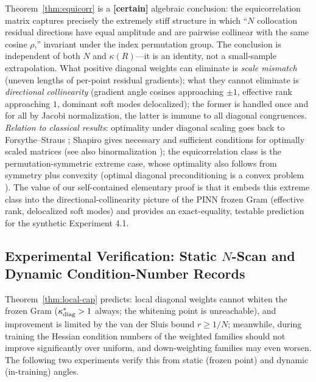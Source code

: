 \documentclass[11pt]{article}
\numberwithin{equation}{section}
\begin{document}
\noindent Theorem~\ref{thm:equicorr} is a \textbf{[certain]} algebraic conclusion: the equicorrelation matrix captures precisely the extremely stiff structure in which ``$N$ collocation residual directions have equal amplitude and are pairwise collinear with the same cosine $\rho$,'' invariant under the index permutation group. The conclusion is independent of both $N$ and $\kappa(R)$---it is an identity, not a small-sample extrapolation. What positive diagonal weights can eliminate is \emph{scale mismatch} (uneven lengths of per-point residual gradients); what they cannot eliminate is \emph{directional collinearity} (gradient angle cosines approaching $\pm1$, effective rank approaching $1$, dominant soft modes delocalized); the former is handled once and for all by Jacobi normalization, the latter is immune to all diagonal congruences. \emph{Relation to classical results}: optimality under diagonal scaling goes back to Forsythe--Straus \cite{ForsytheStraus1955}; Shapiro \cite{Shapiro1982} gives necessary and sufficient conditions for optimally scaled matrices (see also binormalization \cite{LivneGolub2004}); the equicorrelation class is the permutation-symmetric extreme case, whose optimality also follows from symmetry plus convexity (optimal diagonal preconditioning is a convex problem \cite{Qu2025ODP}). The value of our self-contained elementary proof is that it embeds this extreme class into the directional-collinearity picture of the PINN frozen Gram (effective rank, delocalized soft modes) and provides an exact-equality, testable prediction for the synthetic Experiment 4.1.

\subsection{Experimental Verification: Static $N$-Scan and Dynamic Condition-Number Records}\label{sec:R-exp}

Theorem~\ref{thm:local-cap} predicts: local diagonal weights cannot whiten the frozen Gram ($\kappa^*_{\rm diag}>1$ always; the whitening point is unreachable), and improvement is limited by the van der Sluis bound $r\ge1/N$; meanwhile, during training the Hessian condition numbers of the weighted families should not improve significantly over uniform, and down-weighting families may even worsen. The following two experiments verify this from static (frozen point) and dynamic (in-training) angles.
\end{document}
